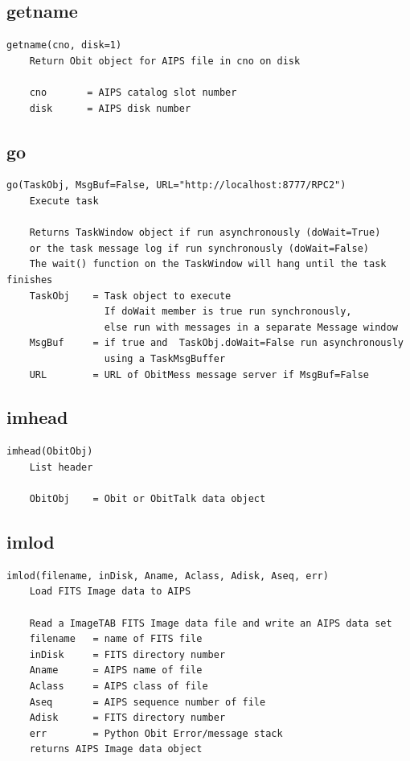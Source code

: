 \documentclass[11pt]{report}
\begin{document}
\subsection{getname}
\begin{verbatim}
getname(cno, disk=1)
    Return Obit object for AIPS file in cno on disk
    
    cno       = AIPS catalog slot number 
    disk      = AIPS disk number
\end{verbatim}

\subsection{go}
\begin{verbatim}
go(TaskObj, MsgBuf=False, URL="http://localhost:8777/RPC2")
    Execute task
    
    Returns TaskWindow object if run asynchronously (doWait=True)
    or the task message log if run synchronously (doWait=False)
    The wait() function on the TaskWindow will hang until the task finishes
    TaskObj    = Task object to execute
                 If doWait member is true run synchronously,
                 else run with messages in a separate Message window
    MsgBuf     = if true and  TaskObj.doWait=False run asynchronously
                 using a TaskMsgBuffer
    URL        = URL of ObitMess message server if MsgBuf=False
\end{verbatim}

\subsection{imhead}
\begin{verbatim}
imhead(ObitObj)
    List header
    
    ObitObj    = Obit or ObitTalk data object
\end{verbatim}

\subsection{imlod}
\begin{verbatim}
imlod(filename, inDisk, Aname, Aclass, Adisk, Aseq, err)
    Load FITS Image data to AIPS
    
    Read a ImageTAB FITS Image data file and write an AIPS data set
    filename   = name of FITS file
    inDisk     = FITS directory number
    Aname      = AIPS name of file
    Aclass     = AIPS class of file
    Aseq       = AIPS sequence number of file
    Adisk      = FITS directory number
    err        = Python Obit Error/message stack
    returns AIPS Image data object
\end{verbatim}
\end{document}
